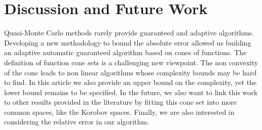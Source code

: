 \documentclass[graybox]{svmult}
\begin{document}
%
%

\section{Discussion and Future Work}
Quasi-Monte Carlo methods rarely provide guaranteed and adaptive algorithms. Developing a new methodology to bound the absolute error allowed us building an adaptive automatic guaranteed algorithm based on cones of functions. The definition of function cone sets is a challenging new viewpoint. The non convexity of the cone leads to non linear algorithms whose complexity bounds may be hard to find. In this article we also provide an upper bound on the complexity, yet the lower bound remains to be specified. In the future, we also want to link this work to other results provided in the literature by fitting this cone set into more common spaces, like the Korobov spaces. Finally, we are also interested in considering the relative error in our algorithm.
\end{document}
